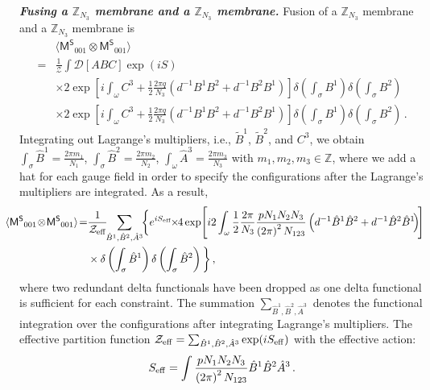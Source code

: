 \documentclass[11pt,nofootinbib,preprint]{revtex4-1}
\def\Z{\mathbb{Z}}
\begin{document}
\textbf{\textit{Fusing a $\mathbb{Z} _{N_3}$ membrane and a $\mathbb{Z} _{N_3}$ membrane.}}
Fusion of a $\mathbb{Z} _{N_3}$ membrane and a $\mathbb{Z} _{N_3}$ membrane is
\begin{align}
	&\langle \mathsf{M^S}_{001}\otimes \mathsf{M^S}_{001} \rangle  \nonumber\\
	=& \frac{1}{\mathcal{Z}}\!\!\int\!\! \mathcal{D} \!\left[ ABC \right]\!   \exp \left( iS \right)\nonumber
	\\
	&\times 2\exp \left[ i\int_{\omega}{C^3+\frac{1}{2}\frac{2\pi q}{N_3}\left( d^{-1}B^1B^2+d^{-1}B^2B^1 \right)} \right] \delta \left( \int_{\sigma}{B^1} \right) \delta \left( \int_{\sigma}{B^2} \right) \nonumber
	\\
	&\times 2\exp \left[ i\!\int_{\omega}{C^3+\frac{1}{2}\frac{2\pi q}{N_3}\left( d^{-1}B^1B^2+d^{-1}B^2B^1 \right)} \right] \!\delta \left( \int_{\sigma}{B^1} \right)\! \delta \left( \int_{\sigma}{B^2} \right) \,.
\end{align}
Integrating out Lagrange's multipliers, i.e., $\tilde{B}^1$, $\tilde{B}^2$, and $C^3$, we obtain $\int_{\sigma}{\hat{B}^1}=\frac{2\pi m_1}{N_1}$, $\int_{\sigma}{\hat{B}^2}=\frac{2\pi m_2}{N_2}$, $\int_{\omega}{\hat{A}^3}=\frac{2\pi m_3}{N_3}$ with $m_1,m_2,m_3\in\Z$, where we add a hat for each gauge field in order to specify the configurations after the Lagrange's multipliers are integrated. As a result, 
\begin{align}
\!\!\!\!\!\!	\!\!\langle \mathsf{M^S}_{001}\!\otimes \!\mathsf{M^S}_{001} \rangle \!=&\frac{1}{\mathcal{Z}_{\rm eff}}   \!\!\sum_{\hat{B}^1,\hat{B}^2,\hat{A}^3}\!\! \bigg\{e^{iS_{\rm eff}}  \!\!
	\times \!\!4\exp\! \left[ i2\int_{\omega}{\frac{1}{2}\frac{2\pi}{N_3}\frac{pN_1N_2N_3}{\left( 2\pi \right) ^2N_{123}}\left( d^{-1}\hat{B}^1\hat{B}^2+d^{-1}\hat{B}^2\hat{B}^1 \!\right)} \!\right] \nonumber
	\\
	&\times \delta \left( \int_{\sigma}{\hat{B}^1} \right) \delta \left( \int_{\sigma}{\hat{B}^2} \right)     \bigg\}\,,
	\label{eq_illustrate_nonAbelianfusion}
\end{align}
where two redundant delta functionals have been dropped as one delta functional  is sufficient for each constraint. The summation $\sum_{\hat{B}^1,\hat{B}^2,\hat{A}^3}$ denotes the functional integration over  the configurations after integrating Lagrange's multipliers. The effective partition function $\mathcal{Z}_{\rm eff}=\sum_{\hat{B}^1,\hat{B}^2,\hat{A}^3}\exp(iS_{\rm eff})$ with the effective action: 
\begin{align}
S_{\rm eff}= \int{\frac{pN_1N_2N_3}{\left( 2\pi \right) ^2N_{123}}\hat{B}^1\hat{B}^2\hat{A}^3}\,.
\end{align}
\end{document}
